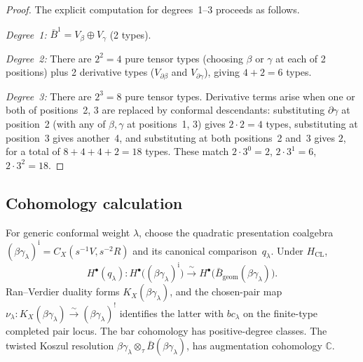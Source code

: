 \begin{proof}
The explicit computation for degrees~1--3 proceeds as follows.

\emph{Degree~1:} $\bar{B}^1 = V_\beta \oplus V_\gamma$ (2 types).

\emph{Degree~2:} There are $2^2 = 4$ pure tensor types (choosing $\beta$ or $\gamma$ at each of 2 positions) plus 2 derivative types ($V_{\partial\beta}$ and $V_{\partial\gamma}$), giving $4 + 2 = 6$ types.

\emph{Degree~3:} There are $2^3 = 8$ pure tensor types. Derivative terms arise when one or both of positions~2, 3 are replaced by conformal descendants: substituting $\partial\gamma$ at position~2 (with any of $\beta, \gamma$ at positions~1, 3) gives $2 \cdot 2 = 4$ types, substituting at position~3 gives another~4, and substituting at both positions~2 and~3 gives $2$, for a total of $8 + 4 + 4 + 2 = 18$ types. These match $2 \cdot 3^0 = 2$, $2 \cdot 3^1 = 6$, $2 \cdot 3^2 = 18$.
\end{proof}

\subsection{Cohomology calculation}

\begin{theorem}
\label{thm:betagamma-bar-cohomology}
For generic conformal weight $\lambda$, choose the quadratic
presentation coalgebra
$(\beta\gamma_\lambda)^{\mathrm i}
=C_X(s^{-1}V,s^{-2}R)$ and its canonical comparison~$q_\lambda$.
Under $H_{\mathrm{CL}}$,
\[
H^\bullet(q_\lambda)\colon
H^\bullet\!\bigl((\beta\gamma_\lambda)^{\mathrm i}\bigr)
\xrightarrow{\;\sim\;}
H^\bullet\!\bigl(\bar{B}_{\mathrm{geom}}
(\beta\gamma_\lambda)\bigr).
\]
Ran--Verdier duality forms
$K_X(\beta\gamma_\lambda)$, and the chosen-pair map
$\nu_\lambda\colon K_X(\beta\gamma_\lambda)
\xrightarrow{\sim}(\beta\gamma_\lambda)^!$
identifies the latter with $bc_\lambda$ on the finite-type completed
pair locus.  The bar cohomology has positive-degree classes.  The
twisted Koszul resolution
$\beta\gamma_\lambda\otimes_{\tau}\bar{B}(\beta\gamma_\lambda)$,
has augmentation cohomology $\mathbb{C}$.
\end{theorem}

